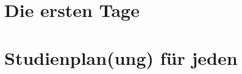 \documentclass[]{papertex}
\begin{document}
	\thispagestyle{empty}
	\clearpage
	\setcounter{page}{1}
	\tableofcontents
	
	\newpage
	\section{Die ersten Tage}
		
		
	\newpage
	\section{Studienplan(ung) für jeden}
		\label{studienplan}
	\newpage
\end{document}
